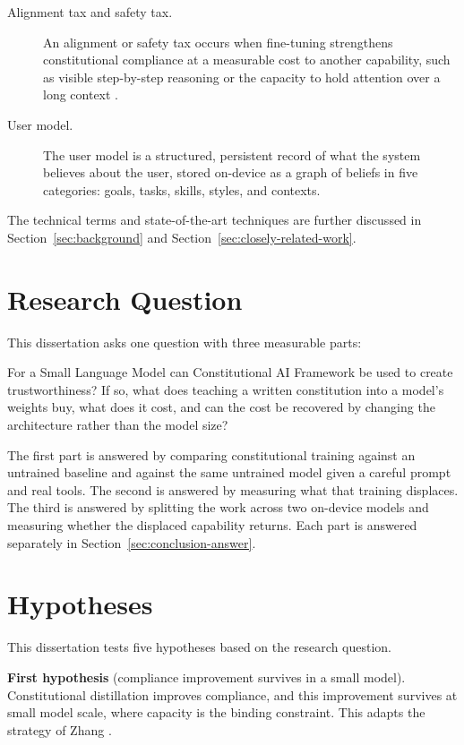 \begin{description}
  \item[Alignment tax and safety tax.] An alignment or safety tax occurs when fine-tuning strengthens constitutional compliance at a measurable cost to another capability, such as visible step-by-step reasoning or the capacity to hold attention over a long context \cite{askell2021generallanguageassistantlaboratory, ouyang2022traininglanguagemodelsfollow, huang2025safetytaxsafetyalignment, fu2026reducingsafetytaxllm}.
  \item[User model.] The user model is a structured, persistent record of what the system believes about the user, stored on-device as a graph of beliefs in five categories: goals, tasks, skills, styles, and contexts.
\end{description}

The technical terms and state-of-the-art techniques are further discussed in Section~\ref{sec:background} and Section~\ref{sec:closely-related-work}.

\section{Research Question}
\label{sec:research-question}

This dissertation asks one question with three measurable parts:

For a Small Language Model can Constitutional AI Framework be used to create trustworthiness? If so, what does teaching a written constitution into a model's weights buy, what does it cost, and can the cost be recovered by changing the architecture rather than the model size?

The first part is answered by comparing constitutional training against an untrained baseline and against the same untrained model given a careful prompt and real tools. The second is answered by measuring what that training displaces. The third is answered by splitting the work across two on-device models and measuring whether the displaced capability returns. Each part is answered separately in Section~\ref{sec:conclusion-answer}.

\section{Hypotheses}
\label{sec:hypotheses}

This dissertation tests five hypotheses based on the research question.

\textbf{First hypothesis} (compliance improvement survives in a small model). Constitutional distillation improves compliance, and this improvement survives at small model scale, where capacity is the binding constraint. This adapts the strategy of Zhang \cite{zhang2025constitutioncollapseexploringconstitutional}.

